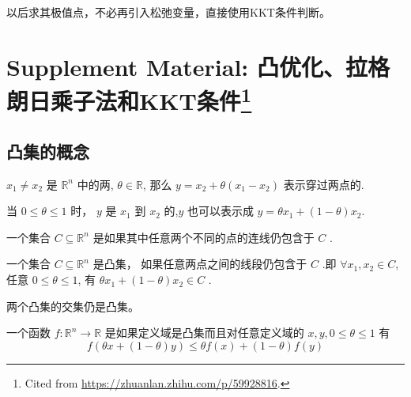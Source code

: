 \begin{remark}
    以后求其极值点，不必再引入松弛变量，直接使用KKT条件判断。
\end{remark}


\section[Supplement Material: 凸优化、拉格朗日乘子法和KKT条件]{Supplement Material: 凸优化、拉格朗日乘子法和KKT条件\footnote{Cited from \url{https://zhuanlan.zhihu.com/p/59928816}.}}

\subsection{凸集的概念}

\begin{definition}[点、（直）线、线段]
    $ x_{1} \neq x_{2} $ 是 $ \mathbb{R}^{n} $ 中的两, $ \theta \in \mathbb{R} $, 那么 $ y=x_{2}+\theta\left(x_{1}-x_{2}\right) $ 表示穿过两点的.

    当 $ 0 \leqslant \theta \leqslant 1 $ 时， $ y $ 是 $ x_{1} $ 到 $ x_{2} $ 的,$ y $ 也可以表示成 $ y=\theta x_{1}+(1-\theta) x_{2} $.
\end{definition}

\begin{definition}[仿射集]
    一个集合 $ C \subseteq \mathbb{R}^{n} $ 是如果其中任意两个不同的点的连线仍包含于 $ C $ .
\end{definition}

\begin{definition}[凸集]
    一个集合 $ C \subseteq \mathbb{R}^{n} $ 是凸集， 如果任意两点之间的线段仍包含于 $ C $ .即 $ \forall x_{1}, x_{2} \in C $, 任意 $ 0 \leqslant \theta \leqslant 1 $, 有 $ \theta x_{1}+(1-\theta) x_{2} \in C $ .
\end{definition}

\begin{theorem}
    两个凸集的交集仍是凸集。
\end{theorem}

\begin{definition}[凸函数]
    一个函数 $ f: \mathbb{R}^{n} \rightarrow \mathbb{R} $ 是如果定义域是凸集而且对任意定义域的 $ x, y, 0 \leqslant \theta \leqslant 1 $ 有
\begin{equation}
f(\theta x+(1-\theta) y) \leqslant \theta f(x)+(1-\theta) f(y)
\end{equation}
\end{definition}

